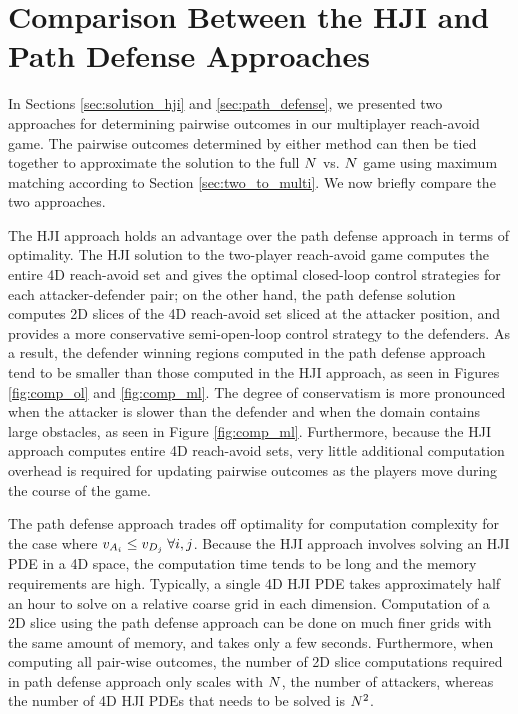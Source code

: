 \section{Comparison Between the HJI and Path Defense Approaches}
\label{sec:comparison}
In Sections \ref{sec:solution_hji} and \ref{sec:path_defense}, we presented two approaches for determining pairwise outcomes in our multiplayer reach-avoid game. The pairwise outcomes determined by either method can then be tied together to approximate the solution to the full $N$ vs. $N$ game using maximum matching according to Section \ref{sec:two_to_multi}. We now briefly compare the two approaches.

The HJI approach holds an advantage over the path defense approach in terms of optimality. The HJI solution to the two-player reach-avoid game computes the entire 4D reach-avoid set and gives the optimal closed-loop control strategies for each attacker-defender pair; on the other hand, the path defense solution computes 2D slices of the 4D reach-avoid set sliced at the attacker position, and provides a more conservative semi-open-loop control strategy to the defenders. As a result, the defender winning regions computed in the path defense approach tend to be smaller than those computed in the HJI approach, as seen in Figures \ref{fig:comp_ol} and \ref{fig:comp_ml}. The degree of conservatism is more pronounced when the attacker is slower than the defender and when the domain contains large obstacles, as seen in Figure \ref{fig:comp_ml}. Furthermore, because the HJI approach computes entire 4D reach-avoid sets, very little additional computation overhead is required for updating pairwise outcomes as the players move during the course of the game.

The path defense approach trades off optimality for computation complexity for the case where $v_{A_{i}}\le v_{D_{j}} \; \forall i,j$. Because the HJI approach involves solving an HJI PDE in a 4D space, the computation time tends to be long and the memory requirements are high. Typically, a single 4D HJI PDE takes approximately half an hour to solve on a relative coarse grid in each dimension. Computation of a 2D slice using the path defense approach can be done on much finer grids with the same amount of memory, and takes only a few seconds. Furthermore, when computing all pair-wise outcomes, the number of 2D slice computations required in path defense approach only scales with $N$, the number of attackers, whereas the number of 4D HJI PDEs that needs to be solved is $N^2$.
